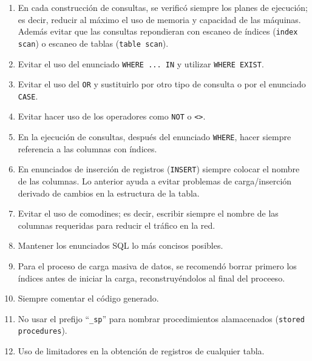 \begin{enumerate}

\item En cada construcción de consultas, se verificó siempre los planes de
  ejecución; es decir, reducir al máximo el uso de memoria y capacidad de las
  máquinas. Además evitar que las consultas repondieran con escaneo de índices
  (\texttt{index scan}) o escaneo de tablas (\texttt{table scan}).

\item Evitar el uso del enunciado \texttt{WHERE ... IN} y utilizar \texttt{WHERE
    EXIST}.

\item Evitar el uso del \texttt{OR} y sustituirlo por otro tipo de consulta o
  por el enunciado \texttt{CASE}.

\item Evitar hacer uso de los operadores como \texttt{NOT} o
  \texttt{\textless\textgreater}.

\item En la ejecución de consultas, después del enunciado \texttt{WHERE}, hacer
  siempre referencia a las columnas con índices.

\item En enunciados de inserción de registros (\texttt{INSERT}) siempre colocar
  el nombre de las columnas. Lo anterior ayuda a evitar problemas de
  carga/inserción derivado de cambios en la estructura de la tabla.

\item Evitar el uso de comodines; es decir, escribir siempre el nombre de las
  columnas requeridas para reducir el tráfico en la red.

\item Mantener los enunciados SQL lo más concisos posibles.

\item Para el proceso de carga masiva de datos, se recomendó borrar primero los
  índices antes de iniciar la carga, reconstruyéndolos al final del proceeso.

\item Siempre comentar el código generado.

\item No usar el prefijo ``\texttt{\_sp}'' para nombrar procedimientos
  alamacenados (\texttt{stored procedures}).

\item Uso de limitadores en la obtención de registros de cualquier tabla.


\end{enumerate}
